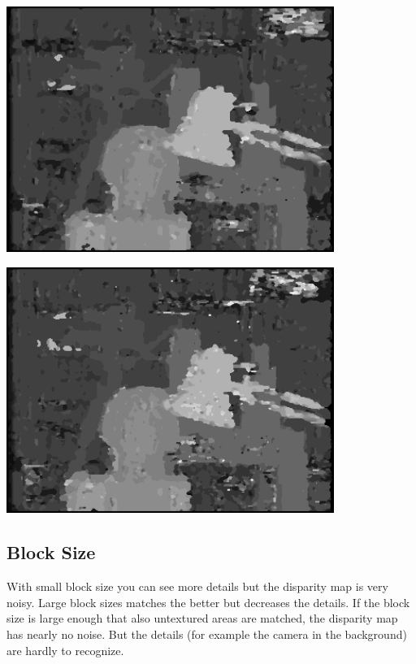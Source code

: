 \documentclass[a4paper]{scrartcl}
\begin{document}
\vspace{1cm}
\begin{minipage}{0.8\textwidth}
  \centering
  \includegraphics[width=0.8\textwidth]{images/disparity-r2-sad-d20-m1.png}
  \label{fig:disparity-r2-sad-d20-m1}
\end{minipage}

\vspace{1cm}
\begin{minipage}{0.8\textwidth}
  \centering
  \includegraphics[width=0.8\textwidth]{images/disparity-r2-ccr-d20-m1.png}
  \label{fig:disparity-r2-ccr-d20-m1}
\end{minipage}


\subsection{Block Size}

With small block size you can see more details but the disparity map is very
noisy. Large block sizes matches the better but decreases the details. If the
block size is large enough that also untextured areas are matched, the
disparity map has nearly no noise. But the details (for example the camera in
the background) are hardly to recognize.
\end{document}
